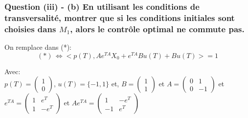 \documentclass[xcolor=dvipsnames]{beamer}
\begin{document}
\begin{frame}
\frametitle{Question (iii) -  (b) En utilisant les conditions de transversalité, montrer que si les conditions initiales sont choisies dans $M_1$, alors le contrôle optimal ne commute pas.}

On remplace dans (*):
 $$(*) \, \iff   <p(T),Ae^{TA}X_0 + e^{TA}Bu(T) + Bu(T)> = 1$$
 
Avec:\\
$p(T) = \left(\begin{matrix} 
        1\\ 
        0
      \end{matrix} \right)$, $ u(T) = \lbrace -1,1 \rbrace$ et,
$B = \left(\begin{matrix} 
        1\\ 
        1
      \end{matrix} \right)$ et $A = \left(\begin{matrix} 
        0 & 1\\ 
        0 & -1
      \end{matrix} \right)$ et $e^{TA} = \left(\begin{matrix} 
        1 & e^{T} \\ 
        1 & -e^{T}
      \end{matrix} \right)$ et $Ae^{TA} = \left(\begin{matrix} 
        1 & -e^{T} \\ 
        -1 & e^{T}
      \end{matrix} \right)$

\end {frame}
\end{document}
